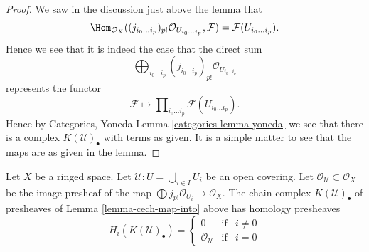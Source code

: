 \begin{proof}
We saw in the discussion just above the lemma that
$$
\Hom_{\mathcal{O}_X}(
(j_{i_0\ldots i_p})_{p!}\mathcal{O}_{U_{i_0\ldots i_p}},
\mathcal{F})
=
\mathcal{F}(U_{i_0\ldots i_p}).
$$
Hence we see that it is indeed the case that the direct sum
$$
\bigoplus\nolimits_{i_0 \ldots i_p}
(j_{i_0 \ldots i_p})_{p!}\mathcal{O}_{U_{i_0 \ldots i_p}}
$$
represents the functor
$$
\mathcal{F}
\longmapsto
\prod\nolimits_{i_0\ldots i_p} \mathcal{F}(U_{i_0\ldots i_p}).
$$
Hence by Categories, Yoneda Lemma \ref{categories-lemma-yoneda}
we see that there is a complex $K(\mathcal{U})_\bullet$ with terms
as given. It is a simple matter to see that the maps are as given
in the lemma.
\end{proof}

\begin{lemma}
\label{lemma-homology-complex}
Let $X$ be a ringed space.
Let $\mathcal{U} : U = \bigcup_{i \in I} U_i$ be an open covering.
Let $\mathcal{O}_\mathcal{U} \subset \mathcal{O}_X$
be the image presheaf of the map
$\bigoplus j_{p!}\mathcal{O}_{U_i} \to \mathcal{O}_X$.
The chain complex $K(\mathcal{U})_\bullet$ of presheaves
of Lemma \ref{lemma-cech-map-into} above has homology presheaves
$$
H_i(K(\mathcal{U})_\bullet) =
\left\{
\begin{matrix}
0 & \text{if} & i \not = 0 \\
\mathcal{O}_\mathcal{U} & \text{if} & i = 0
\end{matrix}
\right.
$$
\end{lemma}

